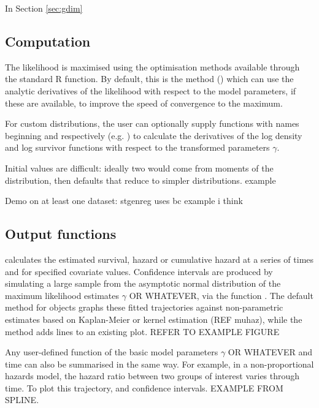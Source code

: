 \documentclass[nojss,nofooter]{jss}
\begin{document}
In Section \ref{sec:gdim} 


\subsection{Computation}

The likelihood is maximised using the optimisation methods available
through the standard R  function.  By default, this is the
 method (\citep{nash}) which can use the analytic
derivatives of the likelihood with respect to the model parameters, if
these are available, to improve the speed of convergence to the
maximum.

For custom distributions, the user can optionally supply functions
with names beginning  and  respectively
(e.g. ) to calculate the derivatives of
the log density and log survivor functions with respect to the
transformed parameters $\gamma$.

Initial values are difficult: ideally two would come from moments of
the distribution, then defaults that reduce to simpler distributions.
example

Demo on at least one dataset: stgenreg uses bc example i think




\subsection{Output functions}

 calculates the estimated survival, hazard
or cumulative hazard at a series of times and for specified covariate
values. Confidence intervals are produced by simulating a large sample
from the asymptotic normal distribution of the maximum likelihood
estimates $\gamma$ OR WHATEVER, via the function
.  The default  method for
 objects graphs these fitted trajectories against
non-parametric estimates based on Kaplan-Meier or kernel estimation
(REF muhaz), while the  method adds lines to an existing
plot.  REFER TO EXAMPLE FIGURE

Any user-defined function of the basic model parameters $\gamma$ OR
WHATEVER and time can also be summarised in the same way.  For
example, in a non-proportional hazards model, the hazard ratio between
two groups of interest varies through time.  To plot this trajectory,
and confidence intervals.   EXAMPLE FROM SPLINE. 
\end{document}

